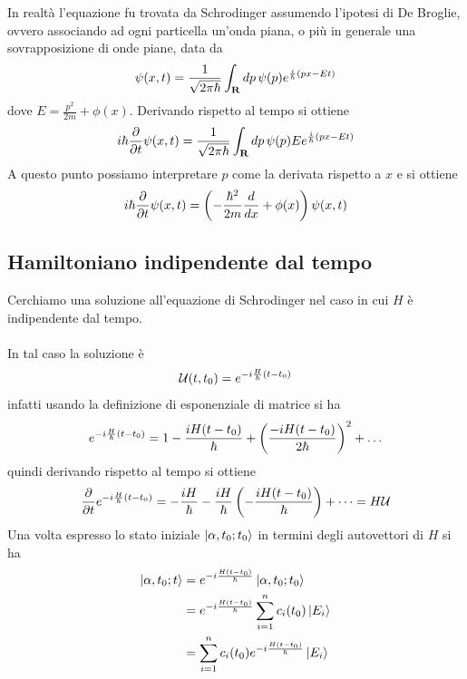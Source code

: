 \documentclass{article}
\begin{document}
In realtà l'equazione fu trovata da Schrodinger assumendo l'ipotesi di De Broglie, ovvero associando ad ogni particella un'onda piana, o più in generale una sovrapposizione di onde piane, data da
\begin{gather}
    \psi(x, t) = \frac{1}{\sqrt{2\pi\hbar}}\int_{\mathbf{R}}dp \, \psi(p)e^{\frac{i}{\hbar}{(px - Et)}} \notag
\end{gather}
dove $E = \frac{p^2}{2m} + \phi(x)$. Derivando rispetto al tempo si ottiene
\begin{align}
    i\hbar\frac{\partial}{\partial t}\psi(x, t) = \frac{1}{\sqrt{2\pi\hbar}}\int_{\mathbf{R}}dp \, \psi(p)Ee^{\frac{i}{\hbar}{(px - Et)}} \notag
\end{align}
A questo punto possiamo interpretare $p$ come la derivata rispetto a $x$ e si ottiene
\begin{gather}
    i\hbar\frac{\partial}{\partial t}\psi(x, t) = \left( -\frac{\hbar^2}{2m}\frac{d}{dx} + \phi(x) \right) \psi(x, t) \notag
\end{gather}

\subsection{Hamiltoniano indipendente dal tempo}
Cerchiamo una soluzione all'equazione di Schrodinger nel caso in cui $H$ è indipendente dal tempo. \\ \\
In tal caso la soluzione è
\begin{gather}
    \mathcal{U}(t, t_0) = e^{-i\frac{H}{\hbar}(t - t_0)} \notag
\end{gather}
infatti usando la definizione di esponenziale di matrice si ha
\begin{gather}
    e^{-i\frac{H}{\hbar}(t - t_0)} = 1 - \frac{iH(t - t_0)}{\hbar} + \left( \frac{-iH(t - t_0)}{2\hbar} \right)^2 + \dots \notag
\end{gather}
quindi derivando rispetto al tempo si ottiene
\begin{gather}
    \frac{\partial}{\partial t}e^{-i\frac{H}{\hbar}(t - t_0)} = -\frac{iH}{\hbar} -\frac{iH}{\hbar}\left( -\frac{iH(t - t_0)}{\hbar} \right) + \dots = H\mathcal{U} \notag
\end{gather}
Una volta espresso lo stato iniziale $\ket{\alpha, t_0; t_0}$ in termini degli autovettori di $H$ si ha
\begin{align}
    \ket{\alpha, t_0; t} &= e^{-i\frac{H(t - t_0)}{\hbar}}\ket{\alpha, t_0; t_0} \notag \\
    &= e^{-i\frac{H(t - t_0)}{\hbar}}\sum_{i = 1}^n c_i(t_0) \ket{E_i} \notag \\
    &= \sum_{i = 1}^n c_i(t_0)e^{-i\frac{H(t - t_0)}{\hbar}}\ket{E_i} \notag
\end{align}
\end{document}
